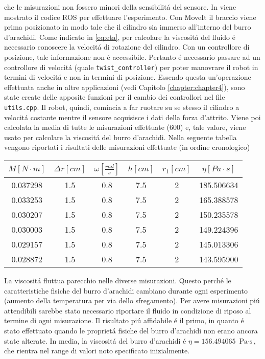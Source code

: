 che le misurazioni non fossero minori della sensibilit\'{a} del sensore.
In \cite{viscosity} viene mostrato il codice ROS per effettuare l'esperimento. 
Con MoveIt il braccio viene prima posizionato in modo tale che il cilindro sia immerso all'interno del burro d'arachidi. 
Come indicato in \ref{eq:eta}, per calcolare la viscosit\'{a} del fluido \'{e} necessario conoscere 
la velocit\'{a} di rotazione del cilindro. Con un controllore di posizione, tale informazione non \'{e} accessibile. 
Pertanto \'{e} necessario passare ad un controllore di velocit\'{a} (quale \verb|twist_controller|) per poter manovrare il robot in 
termini di velocit\'{a} e non in termini di posizione. Essendo questa un'operazione effettuata anche in altre applicazioni (vedi  
Capitolo \ref{chapter:chapter4}), sono state create delle apposite funzioni per il cambio dei controllori nel file \verb|utils.cpp|. 
Il robot, quindi, comincia a far ruotare su se stesso il cilindro a velocit\'{a} costante mentre il sensore acquisisce i dati della 
forza d'attrito. 
Viene poi calcolata la media di tutte le misurazioni effettuate (600) e, tale valore, viene usato per calcolare la viscosit\'{a} 
del burro d'arachidi. 
Nella seguente tabella vengono riportati i risultati delle misurazioni effettuate (in ordine cronologico)
\begin{center}
    \begin{tabular}{ ||c|c|c|c|c|c|| } 
     \hline
     $M \left[N \cdot m\right]$ & $\Delta r \left[cm\right]$ & $\omega \left[\frac{rad}{s}\right]$ & $h \left[cm\right]$ & $r_{1} \left[cm\right]$ & $\eta \left[Pa \cdot s\right]$\\
     \hline\hline 
     0.037298 & 1.5 & 0.8 & 7.5 & 2 & 185.506634 \\ 
     0.033253 & 1.5 & 0.8 & 7.5 & 2 & 165.388578 \\ 
     0.030207 & 1.5 & 0.8 & 7.5 & 2 & 150.235578 \\ 
     0.030003 & 1.5 & 0.8 & 7.5 & 2 & 149.224396 \\ 
     0.029157 & 1.5 & 0.8 & 7.5 & 2 & 145.013306 \\ 
     0.028872 & 1.5 & 0.8 & 7.5 & 2 & 143.595900 \\ 
     \hline
    \end{tabular}
\end{center}
La viscosit\'{a} fluttua parecchio nelle diverse misurazioni. Questo perch\'{e} le caratteristiche fisiche del burro d'arachidi 
cambiano durante ogni esperimento (aumento della temperatura per via dello sfregamento). Per avere misurazioni pi\'{u} attendibili 
sarebbe stato necessario riportare il fluido in condizione di riposo al termine di ogni misurazione. Il risultato pi\'{u} affidabile 
\'{e} il primo, in quanto \'{e} stato effettuato quando le propriet\'{a} fisiche del burro d'arachidi non erano ancora 
state alterate.
In media, la viscosit\'{a} del burro d'arachidi \'{e} $\eta = 156.494065$ $\text{Pa} \cdot \text{s}$, che rientra nel range di 
valori noto specificato inizialmente. 